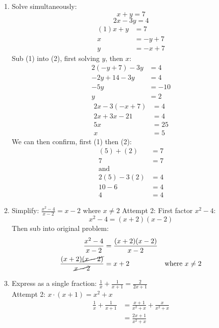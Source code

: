 \documentclass{article}
\begin{document}
\begin{enumerate}
  \item Solve simultaneously:
    \begin{equation}
      x + y = 7
    \end{equation}
    \begin{equation}
      2x - 3y = 4
    \end{equation}
    \begin{align*}
      (1) x + y &= 7 \\
      x &= -y + 7 \\
      y &= -x + 7
    \end{align*}
    Sub (1) into (2), first solving $y$, then $x$: 
    \begin{align*}
      2(-y + 7) - 3y &= 4 \\
      -2y + 14 -3y &= 4 \\
      -5y &= -10 \\
      y &= 2
    \end{align*}
    \begin{align*}
      2x - 3(-x + 7) &= 4 \\
      2x + 3x - 21 &= 4 \\
      5x &= 25 \\
      x &= 5
    \end{align*}
    We can then confirm, first (1) then (2):
    \begin{align*}
      (5) + (2) &= 7 \\
       7 &= 7 \\
      \text{and} \\
      2(5) - 3(2) &= 4 \\
      10 - 6 &= 4 \\
      4 &= 4
    \end{align*}

  \item Simplify: $\frac{x^{2} - 4}{x -2} = x - 2$ where $x \neq 2$
    Attempt 2: First factor $x^{2} - 4$:
    \begin{equation}
      x^{2} - 4 = (x + 2)(x - 2)
    \end{equation}
    Then sub into original problem:
    \begin{align*}
      && \frac{x^{2} - 4}{x - 2} &= \frac{(x + 2)(x - 2)}{x - 2} \\
      && \frac{(x + 2)\cancel{(x - 2)}}{\cancel{x - 2}} &= x + 2 && \text{where } x \neq 2 
    \end{align*}
    
    

  \item Express as a single fraction: $\frac{1}{x} + \frac{1}{x + 1} = \frac{2}{2x + 1}$ \\
    Attempt 2: $x \cdot (x + 1) = x^{2} + x$
    \begin{align*}
      \frac{1}{x} + \frac{1}{x + 1} &= \frac{x + 1}{x^{2} + x} + \frac{x}{x^{2} + x} \\
      &= \frac{2x + 1}{x^{2} + x}
    \end{align*}
    


\end{enumerate}
\end{document}
